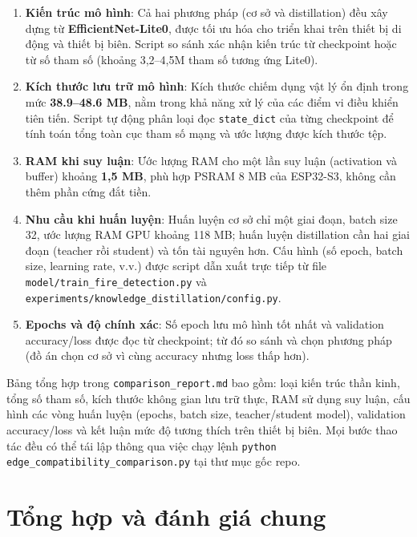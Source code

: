 \documentclass[12pt,a4paper]{report}
\begin{document}
\begin{enumerate}
  \item \textbf{Kiến trúc mô hình}: Cả hai phương pháp (cơ sở và distillation) đều xây dựng từ \textbf{EfficientNet-Lite0}, được tối ưu hóa cho triển khai trên thiết bị di động và thiết bị biên. Script so sánh xác nhận kiến trúc từ checkpoint hoặc từ số tham số (khoảng 3{,}2--4{,}5M tham số tương ứng Lite0).
  \item \textbf{Kích thước lưu trữ mô hình}: Kích thước chiếm dụng vật lý ổn định trong mức \textbf{38.9--48.6 MB}, nằm trong khả năng xử lý của các điểm vi điều khiển tiên tiến. Script tự động phân loại đọc \texttt{state\_dict} của từng checkpoint để tính toán tổng toàn cục tham số mạng và ước lượng được kích thước tệp.
  \item \textbf{RAM khi suy luận}: Ước lượng RAM cho một lần suy luận (activation và buffer) khoảng \textbf{1{,}5 MB}, phù hợp PSRAM 8 MB của ESP32-S3, không cần thêm phần cứng đắt tiền.
  \item \textbf{Nhu cầu khi huấn luyện}: Huấn luyện cơ sở chỉ một giai đoạn, batch size 32, ước lượng RAM GPU khoảng 118 MB; huấn luyện distillation cần hai giai đoạn (teacher rồi student) và tốn tài nguyên hơn. Cấu hình (số epoch, batch size, learning rate, v.v.) được script dẫn xuất trực tiếp từ file \texttt{model/train\_fire\_detection.py} và \texttt{experiments/knowledge\_distillation/config.py}.
  \item \textbf{Epochs và độ chính xác}: Số epoch lưu mô hình tốt nhất và validation accuracy/loss được đọc từ checkpoint; từ đó so sánh và chọn phương pháp (đồ án chọn cơ sở vì cùng accuracy nhưng loss thấp hơn).
\end{enumerate}

Bảng tổng hợp trong \texttt{comparison\_report.md} bao gồm: loại kiến trúc thần kinh, tổng số tham số, kích thước không gian lưu trữ thực, RAM sử dụng suy luận, cấu hình các vòng huấn luyện (epochs, batch size, teacher/student model), validation accuracy/loss và kết luận mức độ tương thích trên thiết bị biên. Mọi bước thao tác đều có thể tái lập thông qua việc chạy lệnh \texttt{python edge\_compatibility\_comparison.py} tại thư mục gốc repo.

\section{Tổng hợp và đánh giá chung}
\end{document}
